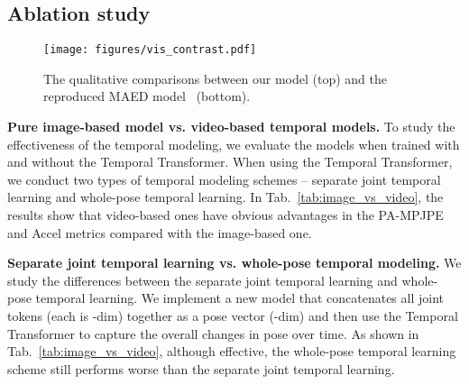 \subsection{Ablation study}






\begin{table}[!htbp]\footnotesize
	\caption{Study on the effectiveness of temporal modeling. We evaluate the performances of the image-based  model and two types of video-based temporal models.}
	\label{tab:image_vs_video}
	\centering
	
			\renewcommand{\arraystretch}{1.1}
	\setlength{\tabcolsep}{0.9mm}

	
\end{table}


\begin{figure}[t]
	\centering
	\texttt{[image: figures/vis\_contrast.pdf]}
	\caption{The qualitative comparisons between our model (top) and the reproduced MAED model~\citep{maed:wan2021encoder} (bottom).  
}
	\label{fig:vis_contrast_3dpw}
\end{figure}


{\bf Pure image-based model vs. video-based temporal models.} To study the effectiveness of the temporal modeling, we evaluate the models when trained with and without the Temporal Transformer. When using the Temporal Transformer, we conduct two types of temporal modeling schemes -- separate joint temporal learning and whole-pose temporal learning. In Tab.~\ref{tab:image_vs_video}, the results show that video-based ones have obvious advantages in the PA-MPJPE and Accel metrics compared with the image-based one.

{\bf Separate joint temporal learning vs. whole-pose temporal modeling.} We study the differences between the separate joint temporal learning and whole-pose temporal learning. We implement a new model that concatenates all joint tokens (each is -dim) together as a pose vector (-dim) and then use the Temporal Transformer to capture the overall changes in pose over time. As shown in Tab.~\ref{tab:image_vs_video}, although effective, the whole-pose temporal learning scheme still performs worse than the separate joint temporal learning.


